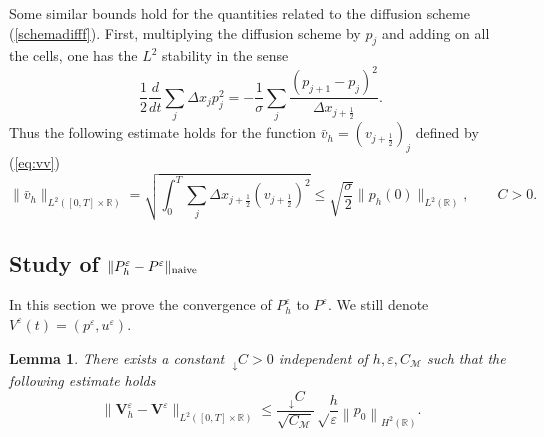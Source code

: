 \documentclass[a4paper,french,english,10pt]{article}
\newcommand\eps{\varepsilon}
\newcommand\V{\mathbf{V}}
\newtheorem{lemma}[theorem]{Lemma}
\begin{document}
Some similar bounds hold 
for  the quantities related to the diffusion scheme (\ref{schemadifff}).
First, multiplying the diffusion scheme by $p_j$ and adding on all the cells,
one has the $L^2$ stability in the sense
\begin{equation*}
\frac12 \frac{d}{dt}\sum_j \Delta x_jp_j^2=-\frac{1}{\sigma}\sum_j
\frac{(p_{j+1}-p_j)^2}{\Delta x_{j+\frac12 }}.
\end{equation*}
Thus 
the following estimate holds for
 the function 
$\bar{v}_h=\left( v_{j+\frac12}  \right)_j$ defined by
(\ref{eq:vv})  
\begin{equation}\label{l2}
 \|\bar{v}_{h}\|_{L^2([0,T]\times\mathbb{R})}
=
\sqrt{
\int_0^T \sum_j \Delta x_{j+\frac12} (v_{j+\frac12} )^2
}
\leq
\sqrt{\frac{\sigma}{2}}\|p_h(0)\|_{L^2(\mathbb R)}, \qquad C>0.
\end{equation}

\subsection{Study of $\| P_h^\varepsilon - P^\varepsilon   \|_{ {\rm naive}}$}


In this section we  
prove the 
convergence of $P_h^\varepsilon $ to  $P^\varepsilon $. We still denote $V^\eps(t)=(p^\eps,u^\eps)$.
\begin{lemma}\label{cv1d}
There exists a constant
$~_\downarrow C
>0
$ independent of  $h,\eps,C_\mathcal M$ such that the following estimate holds
\begin{equation}\label{esti_naive_1d}
\|\V_h^{\eps}-\V^{\eps} \|_{L^2([0,T]\times \mathbb{R})}
\leq 
\frac{~_\downarrow C
}{\sqrt{C_\mathcal M}}
\sqrt \frac{h}\eps 
\left\|  p_0   %
\right\|_{H^2(\mathbb{R})}.
\end{equation}

\end{lemma}
\end{document}
